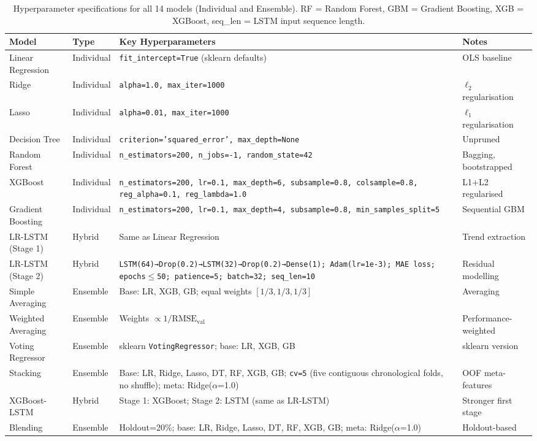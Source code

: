 \documentclass[a4paper,fleqn]{cas-dc}
\begin{document}
\begin{table}[t]
\centering
\caption{Hyperparameter specifications for all 14 models (Individual and Ensemble). RF = Random Forest, GBM = Gradient Boosting, XGB = XGBoost, seq\_len = LSTM input sequence length.\label{tab:hyperparams}}
\small
\begin{tabular}{@{}p{3.2cm}p{1.6cm}p{7.6cm}p{2.8cm}@{}}
\toprule
\textbf{Model} & \textbf{Type} & \textbf{Key Hyperparameters} & \textbf{Notes} \\
\midrule
Linear Regression & Individual & \texttt{fit\_intercept=True} (sklearn defaults) & OLS baseline \\
Ridge & Individual & \texttt{alpha=1.0, max\_iter=1000} & $\ell_2$ regularisation \\
Lasso & Individual & \texttt{alpha=0.01, max\_iter=1000} & $\ell_1$ regularisation \\
Decision Tree & Individual & \texttt{criterion='squared\_error', max\_depth=None} & Unpruned \\
Random Forest & Individual & \texttt{n\_estimators=200, n\_jobs=-1, random\_state=42} & Bagging, bootstrapped \\
XGBoost & Individual & \texttt{n\_estimators=200, lr=0.1, max\_depth=6, subsample=0.8, colsample=0.8, reg\_alpha=0.1, reg\_lambda=1.0} & L1+L2 regularised \\
Gradient Boosting & Individual & \texttt{n\_estimators=200, lr=0.1, max\_depth=4, subsample=0.8, min\_samples\_split=5} & Sequential GBM \\
LR-LSTM (Stage 1) & Hybrid & Same as Linear Regression & Trend extraction \\
LR-LSTM (Stage 2) & Hybrid & \texttt{LSTM(64)→Drop(0.2)→LSTM(32)→Drop(0.2)→Dense(1); Adam(lr=1e-3); MAE loss; epochs$\le$50; patience=5; batch=32; seq\_len=10} & Residual modelling \\
Simple Averaging & Ensemble & Base: LR, XGB, GB; equal weights $[1/3,1/3,1/3]$ & Averaging \\
Weighted Averaging & Ensemble & Weights $\propto 1/\text{RMSE}_{\text{val}}$ & Performance-weighted \\
Voting Regressor & Ensemble & sklearn \texttt{VotingRegressor}; base: LR, XGB, GB & sklearn version \\
Stacking & Ensemble & Base: LR, Ridge, Lasso, DT, RF, XGB, GB; \texttt{cv=5} (five contiguous chronological folds, no shuffle); meta: Ridge($\alpha$=1.0) & OOF meta-features \\
XGBoost-LSTM & Hybrid & Stage 1: XGBoost; Stage 2: LSTM (same as LR-LSTM) & Stronger first stage \\
Blending & Ensemble & Holdout=20\%; base: LR, Ridge, Lasso, DT, RF, XGB, GB; meta: Ridge($\alpha$=1.0) & Holdout-based \\
\bottomrule
\end{tabular}
\end{table}
\end{document}
